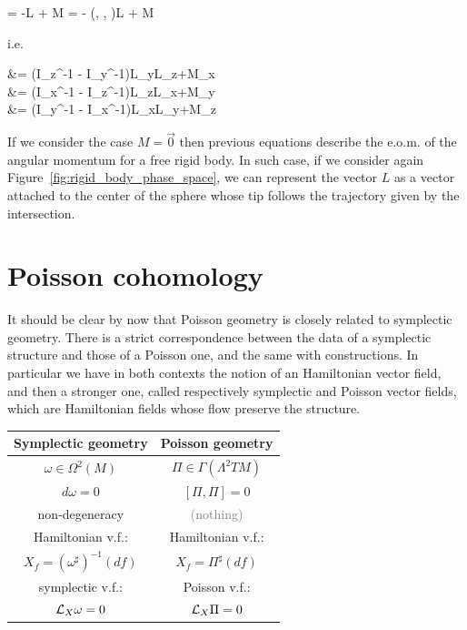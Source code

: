 \documentclass[main.tex]{subfiles}
\begin{document}
\begin{example}
	\begin{eqalign}
		 = -\omega\times L + M = - \left(, ,  \right)\times L + M
	\end{eqalign}
	i.e.
	\begin{eqalign}
		 &= (I_z^{-1} - I_y^{-1})L_yL_z+M_x\\
		 &= (I_x^{-1} - I_z^{-1})L_zL_x+M_y\\
		 &= (I_y^{-1} - I_x^{-1})L_xL_y+M_z
	\end{eqalign}
	If we consider the case $M=\vec 0$ then previous equations describe the e.o.m. of the angular momentum for a free rigid body.  In such case, if we consider again Figure~\ref{fig:rigid_body_phase_space}, we can represent the vector $L$ as a vector attached to the center of the sphere whose tip follows the trajectory given by the intersection.  
\end{example}

\section{Poisson cohomology}
\label{sec:poiss_coh}

It should be clear by now that Poisson geometry is closely related to symplectic geometry. There is a strict correspondence between the data of a symplectic structure and those of a Poisson one, and the same with constructions. In particular we have in both contexts the notion of an Hamiltonian vector field, and then a stronger one, called respectively symplectic and Poisson vector fields, which are Hamiltonian fields whose flow preserve the structure.

 \begin{center}
 	\begin{tabular}{c|c}
 		\textbf{Symplectic geometry} & \textbf{Poisson geometry}\\[1ex]
 		\hline
 		$\omega \in \Omega^2(M)$ & $\Pi \in \Gamma(\Lambda^2TM)$\\[1.5ex]
 		$d\omega = 0$ & $[\Pi,\Pi] = 0$\\[1.5ex]
 		non-degeneracy & \textcolor{gray}{(nothing)}\\[1.5ex]
 		Hamiltonian v.f.: & Hamiltonian v.f.:\\
 		$X_f = (\omega^\sharp)^{-1}(df)$ & $X_f = \Pi^\sharp(df)$\\[1.5ex]
 		symplectic v.f.: & Poisson v.f.:\\
 		$\mathcal{L}_{X}\omega = 0$ & $\mathcal{L}_{X}\Pi = 0$
 	\end{tabular}
 \end{center}
\end{document}
